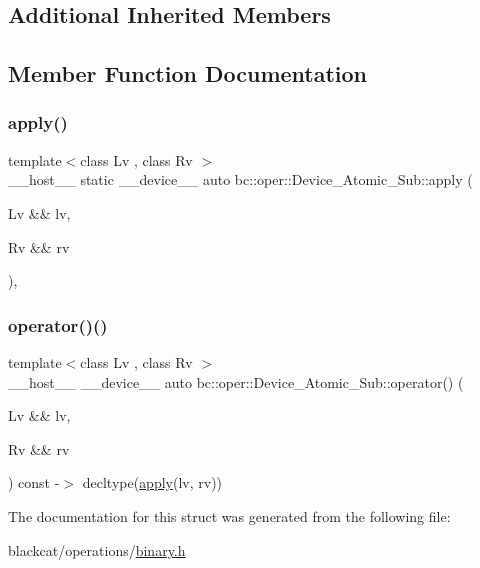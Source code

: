 \subsection*{Additional Inherited Members}


\subsection{Member Function Documentation}
\mbox{\label{structbc_1_1oper_1_1Device__Atomic__Sub_a1aa00894377d8ff531e5b7a991632d20}} 
\subsubsection{\texorpdfstring{apply()}{apply()}}
{\footnotesize\ttfamily template$<$class Lv , class Rv $>$ \\
\+\_\+\+\_\+host\+\_\+\+\_\+ static \+\_\+\+\_\+device\+\_\+\+\_\+ auto bc\+::oper\+::\+Device\+\_\+\+Atomic\+\_\+\+Sub\+::apply (\begin{DoxyParamCaption}\item[{Lv \&\&}]{lv,  }\item[{Rv \&\&}]{rv }\end{DoxyParamCaption})\hspace{0.3cm}{\ttfamily [inline]}, {\ttfamily [static]}}

\mbox{\label{structbc_1_1oper_1_1Device__Atomic__Sub_aaa195e850de4b712330f4623039c4f56}} 
\subsubsection{\texorpdfstring{operator()()}{operator()()}}
{\footnotesize\ttfamily template$<$class Lv , class Rv $>$ \\
\+\_\+\+\_\+host\+\_\+\+\_\+ \+\_\+\+\_\+device\+\_\+\+\_\+ auto bc\+::oper\+::\+Device\+\_\+\+Atomic\+\_\+\+Sub\+::operator() (\begin{DoxyParamCaption}\item[{Lv \&\&}]{lv,  }\item[{Rv \&\&}]{rv }\end{DoxyParamCaption}) const -\/$>$ decltype(\hyperlink{structbc_1_1oper_1_1Device__Atomic__Sub_a1aa00894377d8ff531e5b7a991632d20}{apply}(lv, rv)) \hspace{0.3cm}{\ttfamily [inline]}}



The documentation for this struct was generated from the following file\+:\begin{DoxyCompactItemize}
\item 
blackcat/operations/\hyperlink{binary_8h}{binary.\+h}\end{DoxyCompactItemize}
